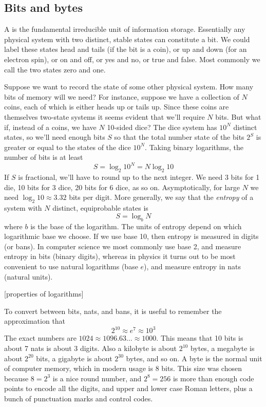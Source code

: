 \documentclass[Lectures.tex]{subfiles}
\begin{document}
\subsection{Bits and bytes}

A  is the fundamental irreducible unit of information storage. 
Essentially any physical system with two distinct, stable states can constitute a bit. We could label these states head and tails (if the bit is a coin), or up and down (for an electron spin), or on and off, or yes and no, or true and false. Most commonly we call the two states zero and one. 

Suppose we want to record the state of some other physical system. How many bits of memory will we need?
For instance, suppose we have a collection of $N$ coins, each of which is either heads up or tails up. 
Since these coins are themselves two-state systems it seems evident that we'll require $N$ bits. But what if, instead of a coins, we have $N$ 10-sided dice?  The dice system has $10^N$ distinct states, so we'll need enough bits $S$ so that the total number state of the bits $2^S$ is greater or equal to the states of the dice $10^N$. Taking binary logarithms, the number of bits is at least
\[
S =  \log_2 10^N = N \log_2 10
\]
If $S$ is fractional, we'll have to round up to the next integer. We need 3 bits for 1 die, 10 bits for 3 dice, 20 bits for 6 dice, as so on. Asymptotically, for large $N$ we need $\log_2 10\approx 3.32$ bits per digit. More generally, we say that the {\sl entropy} of a system with $N$ distinct, equiprobable states is
\[
S = \log_b N 
\]
where $b$ is the base of the logarithm. The units of entropy depend on which logarithmic base we choose. If we use base 10, then entropy is measured in digits (or bans). In computer science we most commonly use base 2, and measure entropy in bits (binary digits), whereas in physics it turns out to be most convenient to use natural logarithms (base $e$), and measure entropy in nats (natural units).

[properties of logarithms] 


To convert between bits, nats, and bans, it is useful to remember the approximation that \[
2^{10}\approx e^7 \approx 10^3 \]
The exact numbers are $1024\approx 1096.63\ldots \approx 1000$. 
This means that 10 bits is about 7 nats is about 3 digits. Also a kilobyte is about $2^{10}$ bytes, a megabyte is about $2^{20}$ bits, a gigabyte is about $2^{30}$ bytes, and so on. A byte is the normal unit of computer memory, which in modern usage is 8 bits. This size was chosen because $8=2^3$ is a nice round number, and $2^8=256$ is more than enough code points to encode all the digits, and upper and lower case Roman letters, plus a bunch of punctuation marks and control codes.
\end{document}
